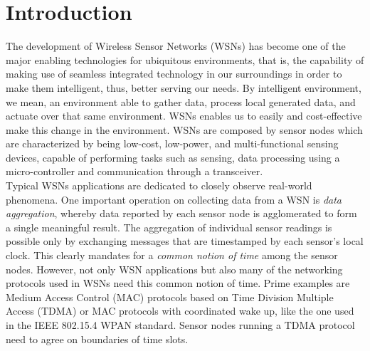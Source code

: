 \section{Introduction}
\label{introduction}

The development of Wireless Sensor Networks (WSNs) \cite{1389832} has become one of the major enabling technologies for ubiquitous environments, that is, the capability of making use of seamless integrated technology in our surroundings in order to make them intelligent, thus, better serving our needs. By intelligent environment, we mean, an environment able to gather data, process local generated data, and actuate over that same environment. WSNs enables us to easily and cost-effective make this change in the environment. WSNs are composed by sensor nodes which are characterized by being low-cost, low-power, and multi-functional sensing devices, capable of performing tasks such as sensing, data processing using a micro-controller and communication through a transceiver.\\

Typical WSNs applications are dedicated to closely observe real-world phenomena. One important operation on collecting data from a WSN is \textit{data aggregation}, whereby data reported by each sensor node is agglomerated to form a single meaningful result. The aggregation of individual sensor readings is possible only by exchanging messages that are timestamped by each sensor's local clock. This clearly mandates for a \textit{common notion of time} among the sensor nodes. However, not only WSN applications but also many of the networking protocols used in WSNs need this common notion of time. Prime examples are Medium Access Control (MAC) protocols based on Time Division Multiple Access (TDMA) or MAC protocols with coordinated wake up, like the one used in the IEEE 802.15.4 WPAN standard. Sensor nodes running a TDMA protocol need to agree on boundaries of time slots.\\

